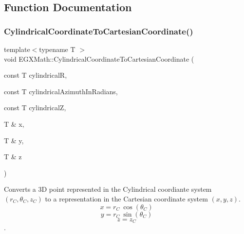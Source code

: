 \subsection{Function Documentation}
\mbox{\label{group___e_g_x_math-_conversions-_coordinate_conversions-3_d-_cylindrical_gafe64821df1452d3ec28206591b123b1a}} 
\subsubsection{\texorpdfstring{Cylindrical\+Coordinate\+To\+Cartesian\+Coordinate()}{CylindricalCoordinateToCartesianCoordinate()}}
{\footnotesize\ttfamily template$<$typename T $>$ \\
void E\+G\+X\+Math\+::\+Cylindrical\+Coordinate\+To\+Cartesian\+Coordinate (\begin{DoxyParamCaption}\item[{const T}]{cylindricalR,  }\item[{const T}]{cylindrical\+Azimuth\+In\+Radians,  }\item[{const T}]{cylindricalZ,  }\item[{T \&}]{x,  }\item[{T \&}]{y,  }\item[{T \&}]{z }\end{DoxyParamCaption})}



Converts a 3D point represented in the Cylindrical coordiante system $(r_C,\theta_C,z_C)$ to a representation in the Cartesian coordinate system $(x,y,z)$. \[ x = r_C\ \cos(\theta_C) \] \[ y = r_C\ \sin(\theta_C) \] \[ z = z_C \]. 

